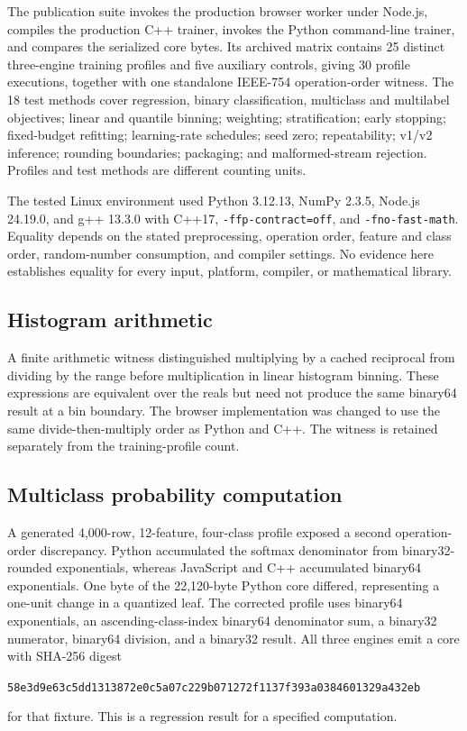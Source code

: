 \documentclass[10pt,a4paper]{article}
\theoremstyle{remark}
\begin{document}
The publication suite invokes the production browser worker under Node.js,
compiles the production C++ trainer, invokes the Python command-line trainer,
and compares the serialized core bytes. Its archived matrix contains 25
distinct three-engine training profiles and five auxiliary controls, giving
30 profile executions, together with one standalone IEEE-754 operation-order
witness. The 18 test methods cover regression, binary classification,
multiclass and multilabel objectives; linear and quantile binning; weighting;
stratification; early stopping; fixed-budget refitting; learning-rate
schedules; seed zero; repeatability; v1/v2 inference; rounding boundaries;
packaging; and malformed-stream rejection. Profiles and test methods are
different counting units.

The tested Linux environment used Python 3.12.13, NumPy 2.3.5, Node.js
24.19.0, and g++ 13.3.0 with C++17, \texttt{-ffp-contract=off}, and
\texttt{-fno-fast-math}. Equality depends on the stated preprocessing,
operation order, feature and class order, random-number consumption, and
compiler settings. No evidence here establishes equality for every input,
platform, compiler, or mathematical library.

\subsection{Histogram arithmetic}

A finite arithmetic witness distinguished multiplying by a cached reciprocal
from dividing by the range before multiplication in linear histogram binning.
These expressions are equivalent over the reals but need not produce the
same binary64 result at a bin boundary. The browser implementation was
changed to use the same divide-then-multiply order as Python and C++. The
witness is retained separately from the training-profile count.

\subsection{Multiclass probability computation}

A generated 4,000-row, 12-feature, four-class profile exposed a second
operation-order discrepancy. Python accumulated the softmax denominator from
binary32-rounded exponentials, whereas JavaScript and C++ accumulated
binary64 exponentials. One byte of the 22,120-byte Python core differed,
representing a one-unit change in a quantized leaf. The corrected profile
uses binary64 exponentials, an ascending-class-index binary64 denominator
sum, a binary32 numerator, binary64 division, and a binary32 result.
All three engines emit a core with SHA-256 digest
\begin{center}
\small\nolinkurl{58e3d9e63c5dd1313872e0c5a07c229b071272f1137f393a0384601329a432eb}
\end{center}
for that fixture. This is a regression result for a specified computation.
\end{document}
